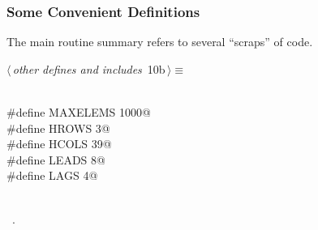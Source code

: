 \documentclass{article}
\begin{document}
\subsubsection{Some Convenient Definitions}
\label{sec:defns}

The main routine summary refers to several ``scraps'' of code.

\begin{flushleft} \small
\begin{minipage}{\linewidth}\label{scrap13}\raggedright\small
{} $\langle\,${\itshape other defines and includes}\nobreak\ {\footnotesize {10b}}$\,\rangle\equiv$
\vspace{-1ex}
\begin{list}{}{} \item
\mbox{}\verb@@\\
\mbox{}\verb@#define MAXELEMS 1000@\\
\mbox{}\verb@#define HROWS 3@\\
\mbox{}\verb@#define HCOLS 39@\\
\mbox{}\verb@#define LEADS 8@\\
\mbox{}\verb@#define LAGS 4@\\
\mbox{}\verb@@\\
\mbox{}\verb@@{\NWsep}
\end{list}
\vspace{-1.5ex}
\footnotesize
\begin{list}{}{\setlength{\itemsep}{-\parsep}\setlength{\itemindent}{-\leftmargin}}
\item \NWtxtMacroRefIn\ .

\item{}
\end{list}
\end{minipage}\vspace{4ex}
\end{flushleft}
\end{document}
